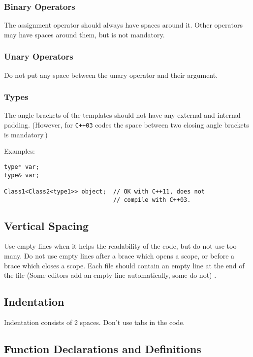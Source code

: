 \documentclass[a4paper]{article}
\begin{document}
\subsubsection{Binary Operators}

The assignment operator should always have spaces around it. Other operators may have spaces around them, but is not mandatory.

\subsubsection{Unary Operators}

Do not put any space between the unary operator and their argument.

\subsubsection{Types}

The angle brackets of the templates should not have any external and internal padding.
(However, for \texttt{C++03} codes the space between two closing angle brackets is mandatory.)

Examples:
\begin{lstlisting}
type* var;
type& var;

Class1<Class2<type1>> object;  // OK with C++11, does not
                               // compile with C++03.
\end{lstlisting}

\subsection{Vertical Spacing}

Use empty lines when it helps the readability of the code, but do not use too many.
Do not use empty lines after a brace which opens a scope,
or before a brace which closes a scope.
Each file should contain an empty line at the end of the file (Some editors add an empty line automatically, some do not) .

\subsection{Indentation}

Indentation consists of 2 spaces. Don't use tabs in the code.

\subsection{Function Declarations and Definitions}
\end{document}
